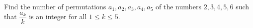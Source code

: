 Find the number of permutations $a_1,a_2,a_3,a_4,a_5$ of the numbers $2,3,4,5,6$ such that $\dfrac{a_k}{k}$ is an integer for all $1\leq k\leq 5$.
